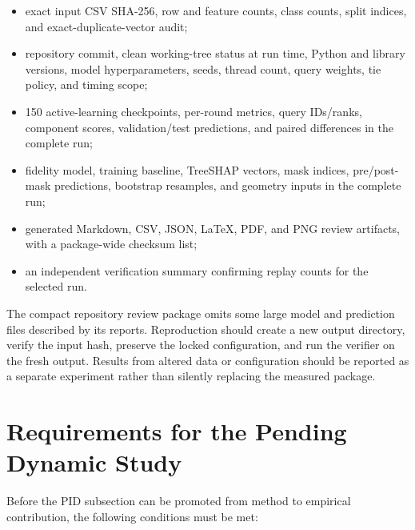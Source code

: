 \begin{itemize}
    \item exact input CSV SHA-256, row and feature counts, class counts, split
    indices, and exact-duplicate-vector audit;
    \item repository commit, clean working-tree status at run time, Python and
    library versions, model hyperparameters, seeds, thread count, query weights,
    tie policy, and timing scope;
    \item 150 active-learning checkpoints, per-round metrics, query IDs/ranks,
    component scores, validation/test predictions, and paired differences in the
    complete run;
    \item fidelity model, training baseline, TreeSHAP vectors, mask indices,
    pre/post-mask predictions, bootstrap resamples, and geometry inputs in the
    complete run;
    \item generated Markdown, CSV, JSON, LaTeX, PDF, and PNG review artifacts,
    with a package-wide checksum list;
    \item an independent verification summary confirming replay counts for the
    selected run.
\end{itemize}

The compact repository review package omits some large model and prediction files
described by its reports. Reproduction should create a new output directory,
verify the input hash, preserve the locked configuration, and run the verifier on
the fresh output. Results from altered data or configuration should be reported as
a separate experiment rather than silently replacing the measured package.

\section{Requirements for the Pending Dynamic Study}

Before the PID subsection can be promoted from method to empirical contribution,
the following conditions must be met:

